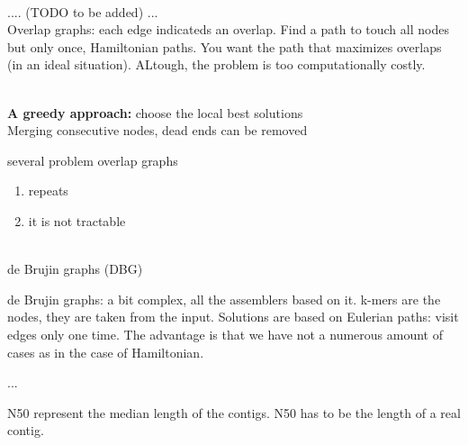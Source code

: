 \\

.... (TODO to be added) ...
\\

Overlap graphs: each edge indicateds an overlap.
Find a path to touch all nodes but only once, Hamiltonian paths. You want the path that maximizes overlaps (in an ideal situation). ALtough, the problem is too computationally costly. 

\\

\textbf{A greedy approach:} choose the local best solutions \\

Merging consecutive nodes, dead ends can be removed


several problem overlap graphs
\begin{enumerate}
\item repeats
\item it is not tractable
\end{enumerate}\\

de Brujin graphs (DBG)


de Brujin graphs: a bit complex, all the assemblers based on it. k-mers are the nodes, they are taken from the input. Solutions are based on Eulerian paths: visit edges only one time. The advantage is that we have not a numerous amount of cases as in the case of Hamiltonian.

...

N50 represent the median length of the contigs. N50 has to be the length of a real contig. 